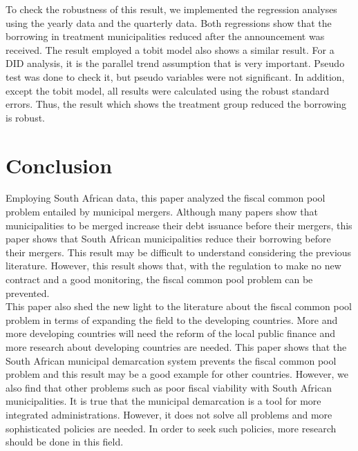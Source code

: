 \documentclass[dvipdfmx]{jsarticle}
\begin{document}
\quad To check the robustness of this result, we implemented the regression analyses using the yearly data and the quarterly data. Both regressions show that the borrowing in treatment municipalities reduced after the announcement was received. The result employed a tobit model also shows a similar result. For a DID analysis, it is the parallel trend assumption that is very important. Pseudo test was done to check it, but pseudo variables were not significant. In addition, except the tobit model, all results were calculated using the robust standard errors. Thus, the result which shows the treatment group reduced the borrowing is robust.
\section{Conclusion}
\quad Employing South African data, this paper analyzed the fiscal common pool problem entailed by municipal mergers. Although many papers show that municipalities to be merged increase their debt issuance before their mergers, this paper shows that South African municipalities reduce their borrowing before their mergers. This result may be difficult to understand considering the previous literature. However, this result shows that, with the regulation to make no new contract and a good monitoring, the fiscal common pool problem can be prevented.\\
\quad This paper also shed the new light to the literature about the fiscal common pool problem in terms of expanding the field to the developing countries. More and more developing countries will need the reform of the local public finance and more research about developing countries are needed. This paper shows that the South African municipal demarcation system prevents the fiscal common pool problem and this result may be a good example for other countries. However, we also find that other problems such as poor fiscal viability with South African municipalities. It is true that the municipal demarcation is a tool for more integrated administrations. However, it does not solve all problems and more sophisticated policies are needed. In order to seek such policies, more research should be done in this field. 


\end{document}
